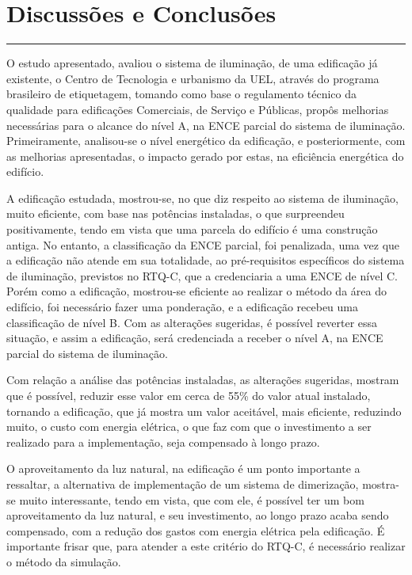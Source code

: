 \chapter{Discussões e Conclusões}\label{chp:conclusao}
\vspace{-1.5cm}
\noindent\rule{\columnwidth}{1.2mm}
\vspace{0.1cm}

O estudo apresentado, avaliou o sistema de iluminação, de uma edificação já existente, o Centro de Tecnologia e urbanismo da UEL, através do programa brasileiro de etiquetagem, tomando como base o regulamento técnico da qualidade para edificações Comerciais, de Serviço e Públicas, propôs melhorias necessárias para o alcance do nível A, na ENCE parcial do sistema de iluminação. Primeiramente, analisou-se o nível energético da edificação, e posteriormente, com as melhorias apresentadas, o impacto gerado por estas, na eficiência energética do edifício.

A edificação estudada, mostrou-se, no que diz respeito ao sistema de iluminação, muito eficiente, com base nas potências instaladas, o que surpreendeu positivamente, tendo em vista que uma parcela do edifício é uma construção antiga. No entanto, a classificação da ENCE parcial, foi penalizada, uma vez que a edificação não atende em sua totalidade, ao pré-requisitos específicos do sistema de iluminação, previstos no RTQ-C, que a credenciaria a uma ENCE de nível C. Porém como a edificação, mostrou-se eficiente ao realizar o método da área do edifício, foi necessário fazer uma ponderação, e a edificação recebeu uma classificação de nível B. Com as alterações sugeridas, é possível reverter essa situação, e assim a edificação, será credenciada a receber o nível A, na ENCE parcial do sistema de iluminação.

Com relação a análise das potências instaladas, as alterações sugeridas, mostram que é possível, reduzir esse valor em cerca de 55\% do valor atual instalado, tornando a edificação, que já mostra um valor aceitável, mais eficiente, reduzindo muito, o custo com energia elétrica, o que faz com que o investimento a ser realizado para a implementação, seja compensado à longo prazo.

O aproveitamento da luz natural, na edificação é um ponto importante a ressaltar, a alternativa de implementação de um sistema de dimerização, mostra-se muito interessante, tendo em vista, que com ele, é possível ter um bom aproveitamento da luz natural, e seu investimento, ao longo prazo acaba sendo compensado, com a redução dos gastos com energia elétrica pela edificação. É importante frisar que, para atender a este critério do RTQ-C, é necessário realizar o método da simulação.

